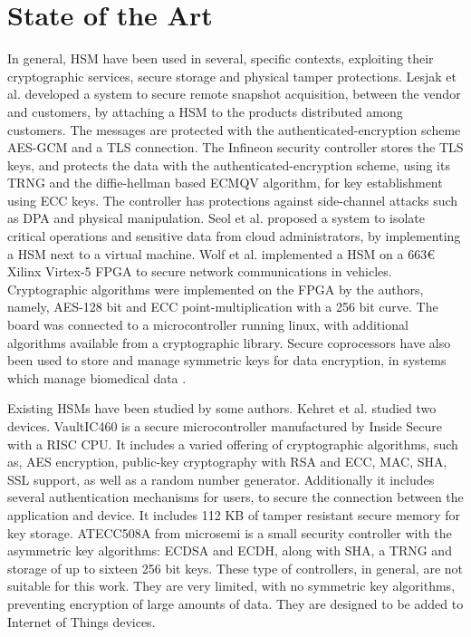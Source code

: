 \section{State of the Art}\label{chap:background:art}

In general, \ac{HSM} have been used in several, specific contexts, exploiting their cryptographic services, secure storage and physical tamper protections.
Lesjak et al. \cite{iothardware} developed a system to secure remote snapshot acquisition, between the vendor and customers, by attaching a HSM to the products distributed among customers. 
The messages are protected with the authenticated-encryption scheme \ac{AES}-\ac{GCM} and a TLS connection.
The Infineon security controller stores the TLS keys, and protects the data with the authenticated-encryption scheme, using its TRNG and the diffie-hellman based ECMQV algorithm, for key establishment using ECC keys. The controller has protections against side-channel attacks such as \ac{DPA} and physical manipulation.
Seol et al. \cite{trustediaashsm} proposed a system to isolate critical operations and sensitive data from cloud administrators, by implementing a \ac{HSM} next to a virtual machine.
Wolf et al. \cite{wolf2011design} implemented a HSM on a 663€ Xilinx Virtex-5 FPGA to secure network communications in vehicles. Cryptographic algorithms were implemented on the FPGA by the authors, namely, AES-128 bit and ECC point-multiplication with a 256 bit curve. The board was connected to a microcontroller running linux, with additional algorithms available from a cryptographic library.
Secure coprocessors have also been used to store and manage symmetric keys for data encryption, in systems which manage biomedical data \cite{canim2011biomedical}.

Existing \ac{HSM}s have been studied by some authors.
Kehret et al. \cite{tlsintegration} studied two devices. VaultIC460 is a secure microcontroller manufactured by Inside Secure with a RISC CPU. It includes a varied offering of cryptographic algorithms, such as, AES encryption, public-key cryptography with RSA and ECC, MAC, SHA, SSL support, as well as a random number generator. Additionally it includes several authentication mechanisms for users, to secure the connection between the application and device.
It includes 112 KB of tamper resistant secure memory for key storage.
ATECC508A from microsemi is a small security controller with the asymmetric key algorithms: ECDSA and ECDH, along with SHA, a TRNG and storage of up to sixteen 256 bit keys.
These type of controllers, in general, are not suitable for this work. They are very limited, with no symmetric key algorithms, preventing encryption of large amounts of data. They are designed to be added to Internet of Things devices.

